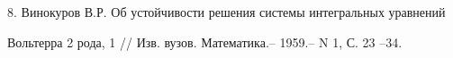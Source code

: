 




\vskip 2cm









\smallskip









\label{end}


























\bibitem{}


8. Винокуров В.Р.  Об устойчивости решения системы интегральных уравнений


Вольтерра 2 рода, 1 // Изв. вузов. Математика.-- 1959.-- N 1, С. 23 --34.














